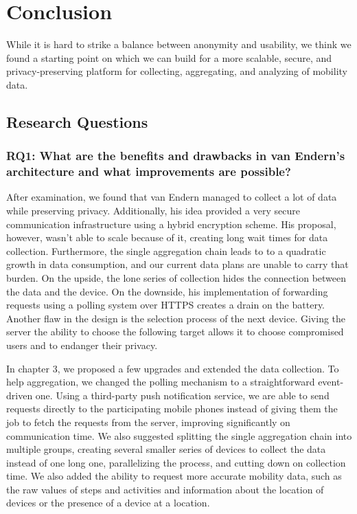 
\chapter{Conclusion}\label{chapter:conclusion}
While it is hard to strike a balance between anonymity and usability, we think we found a starting point on which we can build for a more scalable, secure, and privacy-preserving platform for collecting, aggregating, and analyzing of mobility data.

\section{Research Questions}
\subsection*{RQ1: What are the benefits and drawbacks in van Endern's architecture and what improvements are possible?}
After examination, we found that van Endern managed to collect a lot of data while preserving privacy. Additionally, his idea provided a very secure communication infrastructure using a hybrid encryption scheme. His proposal, however, wasn't able to scale because of it, creating long wait times for data collection.
Furthermore, the single aggregation chain leads to to a quadratic growth in data consumption, and our current data plans are unable to carry that burden. On the upside, the lone series of collection hides the connection between the data and the device. On the downside, his implementation of forwarding requests using a polling system over HTTPS creates a drain on the battery.
Another flaw in the design is the selection process of the next device. Giving the server the ability to choose the following target allows it to choose compromised users and to endanger their privacy. 

In chapter 3, we proposed a few upgrades and extended the data collection. To help aggregation, we changed the polling mechanism to a straightforward event-driven one. Using a third-party push notification service, we are able to send requests directly to the participating mobile phones instead of giving them the job to fetch the requests from the server, improving significantly on communication time. We also suggested splitting the single aggregation chain into multiple groups, creating several smaller series of devices to collect the data instead of one long one, parallelizing the process, and cutting down on collection time. We also added the ability to request more accurate mobility data, such as the raw values of steps and activities and information about the location of devices or the presence of a device at a location. 

